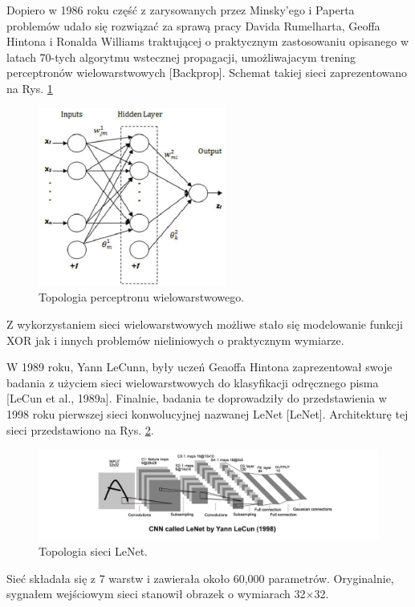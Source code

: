 Dopiero w 1986 roku część z zarysowanych przez Minsky'ego i Paperta problemów udało się rozwiązać za sprawą pracy Davida Rumelharta, Geoffa Hintona i Ronalda Williams traktującej o praktycznym zastosowaniu opisanego w latach 70-tych algorytmu wstecznej propagacji, umożliwajacym trening perceptronów wielowarstwowych [Backprop]. Schemat takiej sieci zaprezentowano na Rys. \ref{MLperceptron}
\begin{figure}[h!]
	\centering
	\includegraphics[width=0.55\textwidth]{figures/MLperceptron.png}
	\caption{Topologia perceptronu wielowarstwowego.}
	\label{MLperceptron}
\end{figure}

Z wykorzystaniem sieci wielowarstwowych możliwe stało się modelowanie funkcji XOR jak i innych problemów nieliniowych o praktycznym wymiarze. 

W 1989 roku, Yann LeCunn, były uczeń Geaoffa Hintona zaprezentował swoje badania z użyciem sieci wielowarstwowych do klasyfikacji odręcznego pisma [LeCun et al., 1989a]. Finalnie, badania te doprowadziły do przedstawienia w 1998 roku pierwszej sieci konwolucyjnej nazwanej LeNet [LeNet]. Architekturę tej sieci przedstawiono na Rys. \ref{LeNet}.
\begin{figure}[h!]
	\centering
	\includegraphics[width=1\textwidth]{figures/lenet.png}
	\caption{Topologia sieci LeNet.}
	\label{LeNet}
\end{figure}

Sieć składała się z 7 warstw i zawierała około 60,000 parametrów. Oryginalnie, sygnałem wejściowym sieci stanowił obrazek o wymiarach 32$\times$32.

